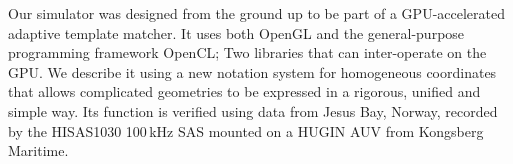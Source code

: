 

Our simulator was designed from the ground up to be part of a GPU-accelerated adaptive template matcher. It uses both OpenGL and the general-purpose programming framework OpenCL; Two libraries that can inter-operate on the GPU. We describe it using a new notation system for homogeneous coordinates that allows complicated geometries to be expressed in a rigorous, unified and simple way. Its function is verified using data from Jesus Bay, Norway, recorded by the HISAS1030 100\,kHz SAS  mounted on a HUGIN AUV from Kongsberg Maritime.

%
%









